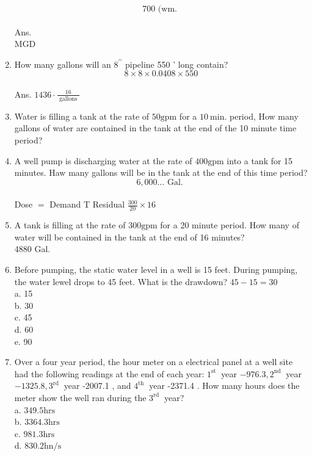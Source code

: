 \begin{enumerate}
$$
700 \text { (wm. }
$$\\
Ans.\\
MGD\\
\item How many gallons will an $8^{\prime \prime}$ pipeline 550 ' long contain?\\
$$
8 \times 8 \times 0.0408 \times 550
$$\\
Ans. $1436 \cdot \frac{16}{\text { gallons }}$\\
\item Water is filling a tank at the rate of $50 \mathrm{gpm}$ for a $10 \mathrm{~min}$. period, How many gallons of water are contained in the tank at the end of the 10 minute time period?\\
\item A well pump is discharging water at the rate of $400 \mathrm{gpm}$ into a tank for 15 minutes. Haw many gallons will be in the tank at the end of this time period?\\
$$
6,000 \ldots \text { Gal. }
$$\\
Dose $=$ Demand T Residual $\frac{300}{20} \times 16$\\
\item A tank is filling at the rate of $300 \mathrm{gpm}$ for a 20 minute period. How many of water will be contained in the tank at the end of 16 minutes?\\
4880 Gal.\\
\item Before pumping, the static water level in a well is 15 feet. During pumping, the water lewel drops to 45 feet. What is the drawdown? $45-15=30$\\
a. 15\\
b. 30\\
c. 45\\
d. 60\\
e. 90\\
\item Over a four year period, the hour meter on a electrical panel at a well site had the following readings at the end of each year: $1^{\text {st }}$ year $-976.3,2^{\text {nd }}$ year $-1325.8,3^{\text {rd }}$ year -2007.1 , and $4^{\text {th }}$ year -2371.4 . How many hours does the meter show the well ran during the $3^{\text {rd }}$ year?\\
a. $349.5 \mathrm{hrs}$\\
b. $3364.3 \mathrm{hrs}$\\
c. $981.3 \mathrm{hrs}$\\
d. $830.2 \mathrm{hn} / \mathrm{s}$\\

\end{enumerate}
